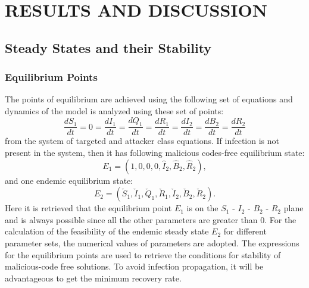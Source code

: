 \chapter{RESULTS AND DISCUSSION}
\section{Steady States and their Stability}
\subsection{Equilibrium Points}
The points of equilibrium are achieved using the following set of equations and
 dynamics of the model is analyzed using these set of points:
\begin{equation}\frac{d S_1}{dt} = 0 = \frac{d I_1}{dt}=\frac{d Q_1}{dt}=\frac{d R_1}{dt}=\frac{d I_2}{dt}=\frac{d B_2}{dt}=\frac{d R_2}{dt}\end{equation}
from the system of targeted and attacker class equations.
If infection is not present in the system, then it has following malicious codes-free equilibrium state:
\begin{equation*}E_1 = (1, 0, 0, 0, \hat I_2, \hat B_2,\hat R_2),\end{equation*}
and one endemic equilibrium state:
\begin{equation*}E_2 = (\check S_1,\check I_1 ,\check Q_1,\check R_1,\check I_2, \check B_2,\check R_2 ).\end{equation*}
Here it is retrieved that the equilibrium point $E_1$ is on the $S_1$ - $I_2$ - $B_2$ - $R_2$ plane and is always possible since all the other parameters are greater than 0.
For the calculation of the feasibility of
 the endemic steady state $E_2$ for different parameter sets, the numerical values of parameters are adopted.
The expressions for the equilibrium points are used to retrieve the conditions for
 stability of malicious-code free solutions. To avoid infection propagation, it will be advantageous
to get the minimum recovery rate.
\clearpage
